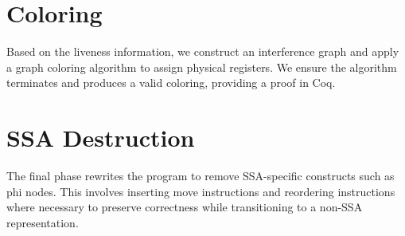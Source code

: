 \section{Coloring}

Based on the liveness information, we construct an interference graph and apply a graph coloring algorithm to assign physical registers. We ensure the algorithm terminates and produces a valid coloring, providing a proof in Coq.

\section{SSA Destruction}

The final phase rewrites the program to remove SSA-specific constructs such as phi nodes. This involves inserting move instructions and reordering instructions where necessary to preserve correctness while transitioning to a non-SSA representation.